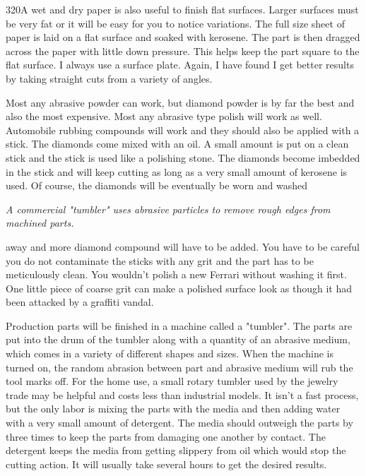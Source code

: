 320A wet and dry paper is also useful to finish flat surfaces. Larger surfaces
must be very fat or it will be easy for you to notice variations. The full size
sheet of paper is laid on a flat surface and soaked with kerosene. The part is
then dragged across the paper with little down pressure. This helps keep the
part square to the flat surface. I always use a surface plate. Again, I have
found I get better results by taking straight cuts from a variety of angles.


Most any abrasive powder can work, but diamond powder is by far the best and
also the most expensive. Most any abrasive type polish will work as well.
Automobile rubbing compounds will work and they should also be applied with a
stick. The diamonds come mixed with an oil. A small amount is put on a clean
stick and the stick is used like a polishing stone. The diamonds become imbedded
in the stick and will keep cutting as long as a very small amount of kerosene is
used. Of course, the diamonds will be eventually be worn and washed

\bigskip
\textit{A commercial "tumbler" uses abrasive particles to remove rough edges
from machined parts.}
\bigskip

away and more diamond compound will have to be added. You have to be careful you
do not contaminate the sticks with any grit and the part has to be meticulously
clean. You wouldn't polish a new Ferrari without washing it first. One little
piece of coarse grit can make a polished surface look as though it had been
attacked by a graffiti vandal.


Production parts will be finished in a machine called a "tumbler". The parts are
put into the drum of the tumbler along with a quantity of an abrasive medium,
which comes in a variety of different shapes and sizes. When the machine is
turned on, the random abrasion between part and abrasive medium will rub the
tool marks off. For the home use, a small rotary tumbler used by the jewelry
trade may be helpful and costs less than industrial models. It isn't a fast
process, but the only labor is mixing the parts with the media and then adding
water with a very small amount of detergent. The media should outweigh the parts
by three times to keep the parts from damaging one another by contact. The
detergent keeps the media from getting slippery from oil which would stop the
cutting action. It will usually take several hours to get the desired results.

